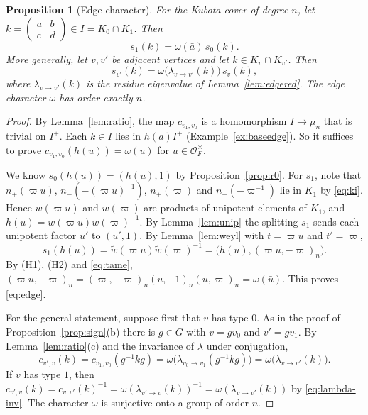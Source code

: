 \documentclass[12pt,letterpaper]{article}
\numberwithin{equation}{section}
\newtheorem{proposition}[theorem]{Proposition}
\theoremstyle{definition}
\theoremstyle{remark}
\newcommand{\OO}{\mathcal O_F}
\newcommand{\np}{n_{+}}
\newcommand{\nm}{n_{-}}
\newcommand{\sm}[4]{\left(\begin{smallmatrix}#1&#2\\#3&#4\end{smallmatrix}\right)}
\begin{document}
\begin{proposition}[Edge character]\label{prop:edge}
For the Kubota cover of degree $n$, let $k=\sm abcd\in I=K_0\cap K_1$. Then
\begin{equation}\label{eq:edge}
 s_1(k)=\omega(\bar a)\,s_0(k).
\end{equation}
More generally, let $v,v'$ be adjacent vertices and let $k\in K_v\cap K_{v'}$. Then
\begin{equation}\label{eq:edgegen}
 s_{v'}(k)=\omega\bigl(\lambda_{v\to v'}(k)\bigr)\,s_v(k),
\end{equation}
where $\lambda_{v\to v'}(k)$ is the residue eigenvalue of Lemma~\ref{lem:edgered}. The edge character $\omega$ has order exactly $n$.
\end{proposition}
\begin{proof}
By Lemma~\ref{lem:ratio}, the map $c_{v_1,v_0}$ is a homomorphism $I\to\mu_n$ that is trivial on $I^+$. Each $k\in I$ lies in $h(a)I^+$ (Example~\ref{ex:baseedge}). So it suffices to prove $c_{v_1,v_0}(h(u))=\omega(\bar u)$ for $u\in\OO^\times$.

We know $s_0(h(u))=(h(u),1)$ by Proposition~\ref{prop:r0}. For $s_1$, note that $\np(\varpi u)$, $\nm(-(\varpi u)^{-1})$, $\np(\varpi)$ and $\nm(-\varpi^{-1})$ lie in $K_1$ by \eqref{eq:ki}. Hence $w(\varpi u)$ and $w(\varpi)$ are products of unipotent elements of $K_1$, and $h(u)=w(\varpi u)w(\varpi)^{-1}$. By Lemma~\ref{lem:unip} the splitting $s_1$ sends each unipotent factor $u'$ to $(u',1)$. By Lemma~\ref{lem:weyl} with $t=\varpi u$ and $t'=\varpi$,
\[
 s_1(h(u))=\widetilde w(\varpi u)\widetilde w(\varpi)^{-1}
 =\bigl(h(u),(\varpi u,-\varpi)_n\bigr).
\]
By (H1), (H2) and \eqref{eq:tame}, $(\varpi u,-\varpi)_n=(\varpi,-\varpi)_n(u,-1)_n(u,\varpi)_n=\omega(\bar u)$. This proves \eqref{eq:edge}.

For the general statement, suppose first that $v$ has type $0$. As in the proof of Proposition~\ref{prop:sign}(b) there is $g\in G$ with $v=gv_0$ and $v'=gv_1$. By Lemma~\ref{lem:ratio}(c) and the invariance of $\lambda$ under conjugation,
\[
 c_{v',v}(k)=c_{v_1,v_0}(g^{-1}kg)=\omega\bigl(\lambda_{v_0\to v_1}(g^{-1}kg)\bigr)=\omega\bigl(\lambda_{v\to v'}(k)\bigr).
\]
If $v$ has type $1$, then $c_{v',v}(k)=c_{v,v'}(k)^{-1}=\omega(\lambda_{v'\to v}(k))^{-1}=\omega(\lambda_{v\to v'}(k))$ by \eqref{eq:lambda-inv}. The character $\omega$ is surjective onto a group of order $n$.
\end{proof}
\end{document}
